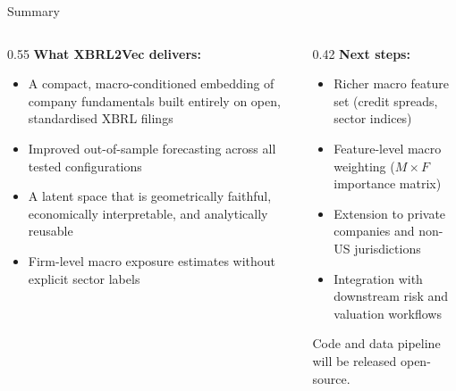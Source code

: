 \documentclass[aspectratio=169]{beamer}
\begin{document}
\begin{frame}{Summary}

  \begin{columns}[T]
    \begin{column}{0.55\textwidth}
      \textbf{What XBRL2Vec delivers:}
      \begin{itemize}
        \item A compact, macro-conditioned embedding of company fundamentals
          built entirely on open, standardised XBRL filings
        \item Improved out-of-sample forecasting across all tested configurations
        \item A latent space that is geometrically faithful, economically
          interpretable, and analytically reusable
        \item Firm-level macro exposure estimates without explicit sector labels
      \end{itemize}
    \end{column}
    \begin{column}{0.42\textwidth}
      \textbf{Next steps:}
      \begin{itemize}
        \item Richer macro feature set (credit spreads, sector indices)
        \item Feature-level macro weighting ($M \times F$ importance matrix)
        \item Extension to private companies and non-US jurisdictions
        \item Integration with downstream risk and valuation workflows
      \end{itemize}
      \vspace{1em}
      \begin{block}{}
        \centering Code and data pipeline will be released open-source.
      \end{block}
    \end{column}
  \end{columns}

\end{frame}
\end{document}

